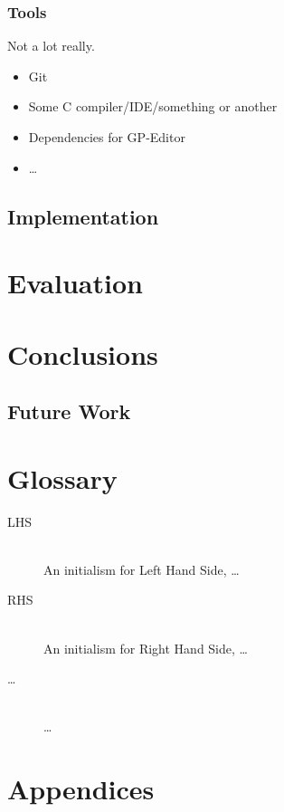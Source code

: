 \documentclass{UoYCSproject}
\begin{document}
\subsection{Tools}
Not a lot really.
\begin{itemize}
  \item Git
  \item Some C compiler/IDE/something or another
  \item Dependencies for GP-Editor
  \item \ldots
\end{itemize}
\section{Implementation}

\chapter{Evaluation}
\chapter{Conclusions}
\section{Future Work}

\chapter{Glossary}
\begin{description}
  \item[LHS] \hfill \\
  An initialism for Left Hand Side, \ldots
  \item[RHS] \hfill \\
  An initialism for Right Hand Side, \ldots
  \item[\ldots] \hfill \\
  \ldots
\end{description}

% 

\chapter{Appendices}
\end{document}
